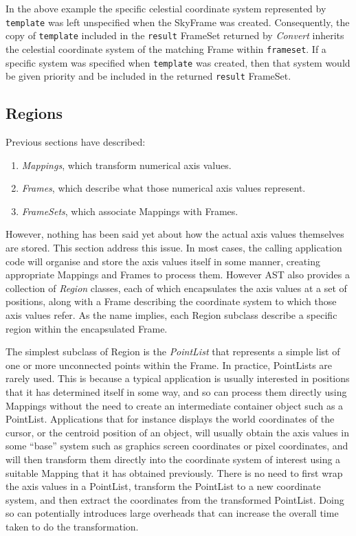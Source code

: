 \documentclass[final,authoryear,5p,times,twocolumn]{elsarticle}
\begin{document}
In the above example the specific celestial coordinate system represented
by \texttt{template} was left unspecified when the SkyFrame was created.
Consequently, the copy of \texttt{template} included in the
\texttt{result} FrameSet returned by \emph{Convert} inherits the
celestial coordinate system of the matching Frame within
\texttt{frameset}. If a specific system was specified when \texttt{template}
was created, then that system would be given priority and be included in
the returned \texttt{result} FrameSet.

\subsection{Regions}
\label{sec:region}

Previous sections have described:

\begin{enumerate}
\item \emph{Mappings}, which transform numerical axis values.
\item \emph{Frames}, which describe what those numerical axis values
represent.
\item \emph{FrameSets}, which associate Mappings with Frames.
\end{enumerate}

However, nothing has been said yet about how the actual axis values
themselves are stored. This section address this issue. In most cases,
the calling application code will organise and store the axis values
itself in some manner, creating appropriate Mappings and Frames to
process them. However AST also provides a collection of \emph{Region}
classes, each of which encapsulates the axis values at a set of positions,
along with a Frame describing the coordinate system to which those axis
values refer.  As the name implies, each Region subclass describe a
specific region within the encapsulated Frame.

The simplest subclass of Region is the \emph{PointList} that represents a
simple list of one or more unconnected points within the Frame.  In
practice, PointLists are rarely used. This is because a typical
application is usually interested in positions that it has determined
itself in some way, and so can process them directly using Mappings
without the need to create an intermediate container object such as a
PointList. Applications that for instance displays the world coordinates
of the cursor, or the centroid position of an object, will usually obtain
the axis values in some ``base'' system such as graphics screen
coordinates or pixel coordinates, and will then transform them directly
into the coordinate system of interest using a suitable Mapping that it
has obtained previously. There is no need to first wrap the axis values
in a PointList, transform the PointList to a new coordinate system, and
then extract the coordinates from the transformed PointList. Doing so can
potentially introduces large overheads that can increase the overall time
taken to do the transformation.
\end{document}
